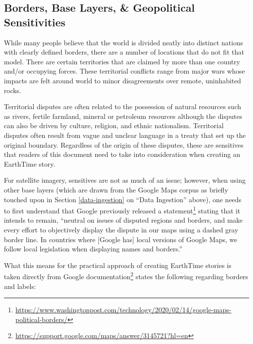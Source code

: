 \documentclass[
  12pt,
]{krantz}
\renewcommand{\href}[2]{#2\footnote{\url{#1}}}
\begin{document}
\hypertarget{borders-base-layers-geopolitical-sensitivities}{%
\subsection{Borders, Base Layers, \& Geopolitical Sensitivities}\label{borders-base-layers-geopolitical-sensitivities}}

While many people believe that the world is divided neatly into distinct nations with clearly defined borders, there are a number of locations that do not fit that model. There are certain territories that are claimed by more than one country and/or occupying forces. These territorial conflicts range from major wars whose impacts are felt around world to minor disagreements over remote, uninhabited rocks.

Territorial disputes are often related to the possession of natural resources such as rivers, fertile farmland, mineral or petroleum resources although the disputes can also be driven by culture, religion, and ethnic nationalism. Territorial disputes often result from vague and unclear language in a treaty that set up the original boundary. Regardless of the origin of these disputes, these are sensitives that readers of this document need to take into consideration when creating an EarthTime story.

For satellite imagery, sensitives are not as much of an issue; however, when using other base layers (which are drawn from the Google Maps corpus as briefly touched upon in Section \ref{data-ingestion} on ``Data Ingestion'' above), one needs to first understand that Google previously \href{https://www.washingtonpost.com/technology/2020/02/14/google-maps-political-borders/}{released a statement} stating that it intends to remain, ``neutral on issues of disputed regions and borders, and make every effort to objectively display the dispute in our maps using a dashed gray border line. In countries where {[}Google has{]} local versions of Google Maps, we follow local legislation when displaying names and borders.''

What this means for the practical approach of creating EarthTime stories is taken directly from \href{https://support.google.com/maps/answer/3145721?hl=en}{Google documentation} states the following regarding borders and labels:
\end{document}
